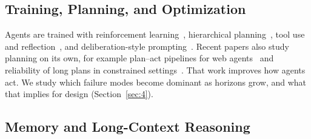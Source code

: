 \documentclass[11pt]{article}
\begin{document}

\subsection{Training, Planning, and Optimization}
\label{subsec:rw_training}

Agents are trained with reinforcement learning~\citep{ouyang2022training}, hierarchical planning~\citep{liu2023llmp,sun2023adaplanner}, tool use and reflection~\citep{yao2023react,shinn2023reflexion}, and deliberation-style prompting~\citep{wei2022chain,yao2023tree}. Recent papers also study planning on its own, for example plan--act pipelines for web agents~\citep{erdogan2025plan} and reliability of long plans in constrained settings~\citep{chen2024can}. That work improves how agents act. We study which failure modes become dominant as horizons grow, and what that implies for design (Section~\ref{sec:4}).


\subsection{Memory and Long-Context Reasoning}
\label{subsec:rw_memory}
\end{document}
